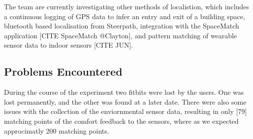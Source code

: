 The team are currently investigating other methods of localistion, which includes a continuous logging of GPS data to infer an entry and exit of a building space, bluetooth based localisation from Steerpath, integration with the SpaceMatch application [CITE SpaceMatch @Clayton], and pattern matching of wearable sensor data to indoor sensors [CITE JUN].


\subsection{Problems Encountered}

During the course of the experiment two fitbits were lost by the users. One was lost permanently, and the other was found at a later date. There were also some issues with the collection of the enviornmental sensor data, resulting in only [79] matching points of the comfort feedback to the sensors, where as we expected approcimatly 200 matching points.





